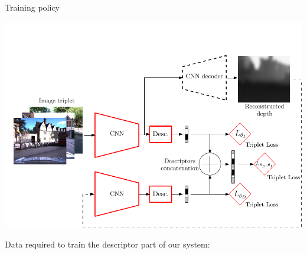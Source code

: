 \begin{frame}{Training policy}
	\only<1>
	{
	\begin{minipage}{0.6\linewidth}
		\centering
		\includegraphics[width=\linewidth]{vect/method/fig3/5d}	
	\end{minipage}\hfill
	\begin{minipage}{0.3\linewidth}
		\raggedright
		Data required to train the descriptor part of our system:
		\vspace{0.5cm}
		

\end{minipage}}
\end{frame}
